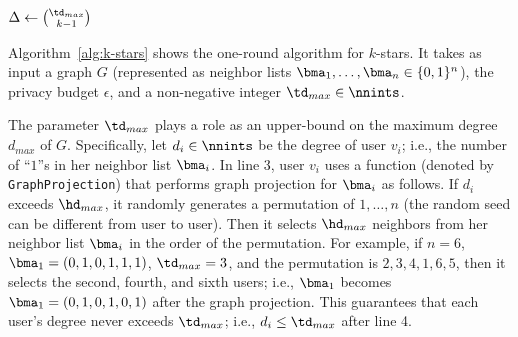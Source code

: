 \begin{algorithm}
  \SetAlgoLined
  $\Delta \leftarrow \binom{\td_{max}}{k-1}$\;
  \caption{\label{alg:k-stars}}
\end{algorithm}

Algorithm~\ref{alg:k-stars} shows the one-round algorithm for $k$-stars. 
It takes as input a graph $G$ (represented as neighbor lists $\bma_1, \ldots, \bma_n \in \{0,1\}^n$), the privacy budget $\epsilon$, and a non-negative integer $\td_{max} \in \nnints$. 

The parameter $\td_{max}$ plays a role as an upper-bound on the maximum degree $d_{max}$ of $G$. 
Specifically, let $d_i \in \nnints$ be the degree of user $v_i$; i.e., the number of ``$1$''s in her neighbor list $\bma_i$. 
In line 3, user $v_i$
uses a function (denoted by \texttt{GraphProjection}) that performs graph projection \cite{Day_SIGMOD16,Kasiviswanathan_TCC13,Raskhodnikova_arXiv15} for $\bma_i$ as follows. 
If $d_i$ exceeds $\hd_{max}$, it randomly generates a permutation of $1,\ldots,n$ (the random seed can be different from user to user). 
Then it selects $\hd_{max}$ neighbors from her neighbor list $\bma_i$ in the order of the permutation.
For example, if $n=6$, $\bma_1=(0,1,0,1,1,1)$, $\td_{max}=3$, and the permutation is $2,3,4,1,6,5$, then 
it selects the second, fourth, and sixth users; i.e., $\bma_1$ becomes $\bma_1=(0,1,0,1,0,1)$ after the graph projection. 
This guarantees that each user's degree never exceeds $\td_{max}$; i.e., $d_i \leq \td_{max}$ after line 4. 

